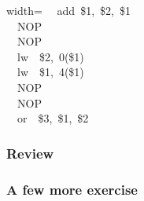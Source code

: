 \documentclass[xcolor=table]{beamer}
\begin{document}
\begin{mdframe}
\begin{mdcenter}%
\begin{mdpre}%
\begin{mdblock}{width=}%
\noindent~~{add}~\$1,~\$2,~\$1\\
~~{NOP}\\
~~{NOP}\\
~~{lw}~~\$2,~{0}(\$1)\\
~~{lw}~~\$1,~{4}(\$1)\\
~~{NOP}\\
~~{NOP}\\
~~{or}~~\$3,~\$1,~\$2%
\end{mdblock}%
\end{mdpre}%
\end{mdcenter}%
\end{mdframe}\label{sec-hw-5-13}%

\begin{mdframe}%

\frametitle{Review}\label{heading-sec-review}%
\end{mdframe}\label{sec-review}%

\begin{mdframe}%

\frametitle{A few more exercise}\label{heading-sec-a-few-more-exercise}%
\end{mdframe}\label{sec-a-few-more-exercise}%
\end{document}

